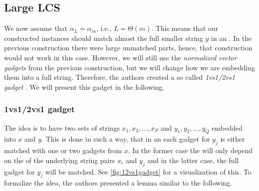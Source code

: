 \subsection{Large LCS}

We now assume that $\alpha_L = \alpha_m$, i.e., $L = \Theta(m)$.
This means that our constructed instances should match almost the full smaller string $y$ in an \lcs{}.
In the previous construction there were large unmatched parts, hence, that construction would not work in this case.
However, we will still use the \emph{normalized vector gadgets} from the previous construction, but we will change how we are embedding them into a full string.
Therefore, the authors created a so called \emph{1vs1/2vs1 gadget} \cite[section 9.2.1]{Bringman.2018}.
We will present this gadget in the following.

\subsubsection{1vs1/2vs1 gadget}
The idea is to have two sets of strings $x_1, x_2, \ldots, x_P$ and $y_1, y_2, \ldots, y_Q$ embedded into $x$ and $y$.
This is done in such a way, that in an \lcs{} each gadget for $y_j$ is either matched with one or two gadgets from $x$.
In the former case the \lcs{} will only depend on the \lcs{} of the underlying string pairs $x_i$ and $y_j$ and in the latter case, the full gadget for $y_j$ will be matched.
See \autoref{fig:12vs1gadget} for a visualization of this.
To formalize the idea, the authors presented a lemma \cite[Lemma 9.6]{Bringman.2018} similar to the following. 







